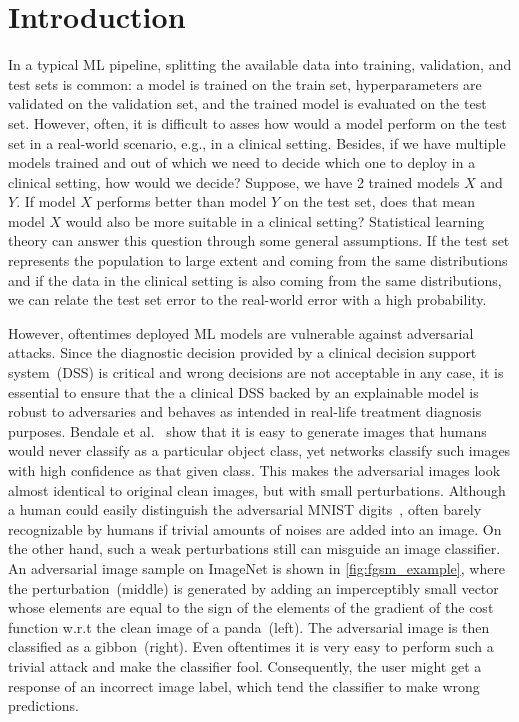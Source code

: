 \section{Introduction}
In a typical ML pipeline, splitting the available data into training, validation, and test sets is common: a model is trained on the train set, hyperparameters are validated on the validation set, and the trained model is evaluated on the test set. However, often, it is difficult to asses how would a model perform on the test set in a real-world scenario, e.g., in a clinical setting. Besides, if we have multiple models trained and out of which we need to decide which one to deploy in a clinical setting, how would we decide? Suppose, we have 2 trained models $X$ and $Y$. If model $X$ performs better than model $Y$ on the test set, does that mean model $X$ would also be more suitable in a clinical setting? Statistical learning theory can answer this question through some general assumptions. If the test set represents the population to large extent and coming from the same distributions and if the data in the clinical setting is also coming from the same distributions, we can relate the test set error to the real-world error with a high probability. 

\hspace*{3.5mm} However, oftentimes deployed ML models are vulnerable against adversarial attacks. Since the diagnostic decision provided by a clinical decision support system~(DSS) is critical and wrong decisions are not acceptable in any case, it is essential to ensure that the a clinical DSS backed by an explainable model is robust to adversaries and behaves as intended in real-life treatment diagnosis purposes. Bendale et al.~\cite{OOD18} show that it is easy to generate images that humans would never classify as a particular object class, yet networks classify such images with high confidence as that given class. This makes the adversarial images look almost identical to original clean images, but with small perturbations. Although a human could easily distinguish the adversarial MNIST digits~\cite{yuan2019adversarial}, often barely recognizable by humans if trivial amounts of noises are added into an image. On the other hand, such a weak perturbations still can misguide an image classifier. An adversarial image sample on ImageNet is shown in \cref{fig:fgsm_example}, where the perturbation~(middle) is generated by adding an imperceptibly small vector whose elements are equal to the sign of the elements of the gradient of the cost function w.r.t the clean image of a panda~(left). The adversarial image is then classified as a gibbon~(right). Even oftentimes it is very easy to perform such a trivial attack and make the classifier fool. Consequently, the user might get a response of an incorrect image label, which tend the classifier to make wrong predictions. 

